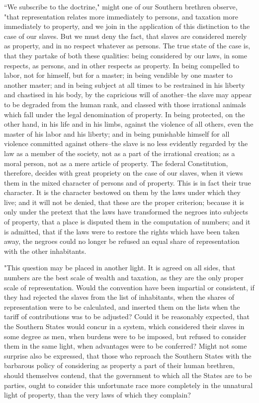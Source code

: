 ``We subscribe to the doctrine," might one of our Southern brethren observe, "that representation relates more immediately to persons, and taxation more immediately to property, and we join in the application of this distinction to the case of our slaves. 
But we must deny the fact, that slaves are considered merely as property, and in no respect whatever as persons. 
The true state of the case is, that they partake of both these qualities: being considered by our laws, in some respects, as persons, and in other respects as property. 
In being compelled to labor, not for himself, but for a master; in being vendible by one master to another master; and in being subject at all times to be restrained in his liberty and chastised in his body, by the capricious will of another--the slave may appear to be degraded from the human rank, and classed with those irrational animals which fall under the legal denomination of property. 
In being protected, on the other hand, in his life and in his limbs, against the violence of all others, even the master of his labor and his liberty; and in being punishable himself for all violence committed against others--the slave is no less evidently regarded by the law as a member of the society, not as a part of the irrational creation; as a moral person, not as a mere article of property. 
The federal Constitution, therefore, decides with great propriety on the case of our slaves, when it views them in the mixed character of persons and of property. 
This is in fact their true character. 
It is the character bestowed on them by the laws under which they live; and it will not be denied, that these are the proper criterion; because it is only under the pretext that the laws have transformed the negroes into subjects of property, that a place is disputed them in the computation of numbers; and it is admitted, that if the laws were to restore the rights which have been taken away, the negroes could no longer be refused an equal share of representation with the other inhabitants.

"This question may be placed in another light. 
It is agreed on all sides, that numbers are the best scale of wealth and taxation, as they are the only proper scale of representation. 
Would the convention have been impartial or consistent, if they had rejected the slaves from the list of inhabitants, when the shares of representation were to be calculated, and inserted them on the lists when the tariff of contributions was to be adjusted? 
Could it be reasonably expected, that the Southern States would concur in a system, which considered their slaves in some degree as men, when burdens were to be imposed, but refused to consider them in the same light, when advantages were to be conferred? 
Might not some surprise also be expressed, that those who reproach the Southern States with the barbarous policy of considering as property a part of their human brethren, should themselves contend, that the government to which all the States are to be parties, ought to consider this unfortunate race more completely in the unnatural light of property, than the very laws of which they complain?

